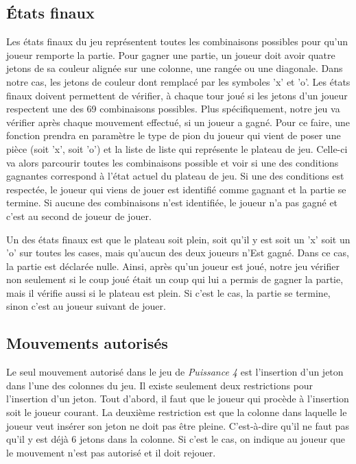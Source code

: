 \documentclass[12pt]{article}
\begin{document}
\subsection*{États finaux}
Les états finaux du jeu représentent toutes les combinaisons possibles pour qu’un joueur remporte la partie. Pour gagner une partie, un joueur doit avoir quatre jetons de sa couleur alignée sur une colonne, une rangée ou une diagonale. Dans notre cas, les jetons de couleur dont remplacé par les symboles 'x' et 'o'. Les états finaux doivent permettent de vérifier, à chaque tour joué si les jetons d’un joueur respectent une des 69 combinaisons possibles. Plus spécifiquement, notre jeu va vérifier après chaque mouvement effectué, si un joueur a gagné. Pour ce faire, une fonction prendra en paramètre le type de pion du joueur qui vient de poser une pièce (soit 'x', soit 'o') et la liste de liste qui représente le plateau de jeu. Celle-ci va alors parcourir toutes les combinaisons possible et voir si une des conditions gagnantes correspond à l'état actuel du plateau de jeu. Si une des conditions est respectée, le joueur qui viens de jouer est identifié comme gagnant et la partie se termine. Si aucune des combinaisons n’est identifiée, le joueur n’a pas gagné et c’est au second de joueur de jouer. 

Un des états finaux est que le plateau soit plein, soit qu'il y est soit un 'x' soit un 'o' sur toutes les cases, mais qu'aucun des deux joueurs n'Est gagné. Dans ce cas, la partie est déclarée nulle. Ainsi, après qu'un joueur est joué, notre jeu vérifier non seulement si le coup joué était un coup qui lui a permis de gagner la partie, mais il vérifie aussi si le plateau est plein. Si c'est le cas, la partie se termine, sinon c'est au joueur suivant de jouer.

\subsection*{Mouvements autorisés}
Le seul mouvement autorisé dans le jeu de \textit{Puissance 4} est l'insertion d'un jeton dans l'une des colonnes du jeu. Il existe seulement deux restrictions pour l'insertion d'un jeton. Tout d'abord, il faut que le joueur qui procède à l'insertion soit le joueur courant. La deuxième restriction est que la colonne dans laquelle le joueur veut insérer son jeton ne doit pas être pleine. C'est-à-dire qu'il ne faut pas qu'il y est déjà 6 jetons dans la colonne. Si c'est le cas, on indique au joueur que le mouvement n'est pas autorisé et il doit rejouer. \\
\end{document}
